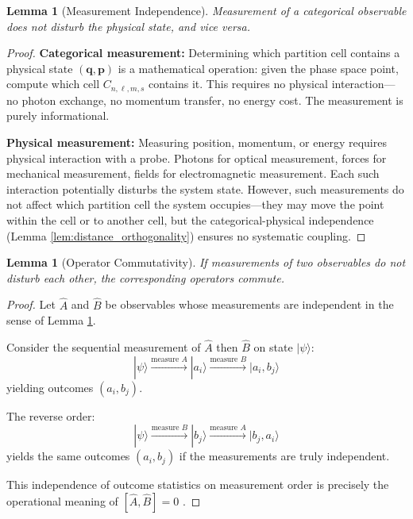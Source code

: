 \documentclass[twocolumn,10pt,twoside]{article}
\newtheorem{lemma}[theorem]{Lemma}
\begin{document}
\begin{lemma}[Measurement Independence]
\label{lem:measurement_independence}
Measurement of a categorical observable does not disturb the physical state, and vice versa.
\end{lemma}

\begin{proof}
\textbf{Categorical measurement:} Determining which partition cell contains a physical state $(\mathbf{q}, \mathbf{p})$ is a mathematical operation: given the phase space point, compute which cell $C_{n,\ell,m,s}$ contains it. This requires no physical interaction---no photon exchange, no momentum transfer, no energy cost. The measurement is purely informational.

\textbf{Physical measurement:} Measuring position, momentum, or energy requires physical interaction with a probe. Photons for optical measurement, forces for mechanical measurement, fields for electromagnetic measurement. Each such interaction potentially disturbs the system state. However, such measurements do not affect which partition cell the system occupies---they may move the point within the cell or to another cell, but the categorical-physical independence (Lemma \ref{lem:distance_orthogonality}) ensures no systematic coupling.
\end{proof}

\begin{lemma}[Operator Commutativity]
\label{lem:operator_commutativity}
If measurements of two observables do not disturb each other, the corresponding operators commute.
\end{lemma}

\begin{proof}
Let $\hat{A}$ and $\hat{B}$ be observables whose measurements are independent in the sense of Lemma \ref{lem:measurement_independence}.

Consider the sequential measurement of $\hat{A}$ then $\hat{B}$ on state $|\psi\rangle$:
\begin{equation}
|\psi\rangle \xrightarrow{\text{measure } A} |a_i\rangle \xrightarrow{\text{measure } B} |a_i, b_j\rangle
\end{equation}
yielding outcomes $(a_i, b_j)$.

The reverse order:
\begin{equation}
|\psi\rangle \xrightarrow{\text{measure } B} |b_j\rangle \xrightarrow{\text{measure } A} |b_j, a_i\rangle
\end{equation}
yields the same outcomes $(a_i, b_j)$ if the measurements are truly independent.

This independence of outcome statistics on measurement order is precisely the operational meaning of $[\hat{A}, \hat{B}] = 0$ \cite{vonneumann1932}.
\end{proof}
\end{document}
